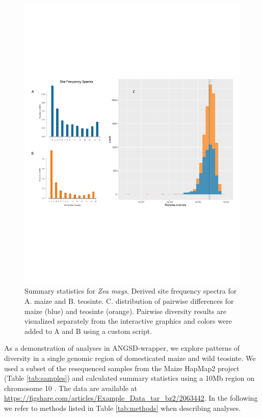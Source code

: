 \documentclass[10pt,a4paper]{article}
\begin{document}
\begin{figure}
\centering
\includegraphics[width=0.8\linewidth]{figures/figure3big.pdf}
\caption{Summary statistics for {\it Zea mays}. Derived site frequency spectra for A. maize and B. teosinte. C. distribution of pairwise differences for maize (blue) and teosinte (orange). Pairwise diversity results are visualized separately from the interactive graphics and colors were added to A and B using a custom script.}
\label{fig:figure3}
\end{figure}
As a demonstration of analyses in ANGSD-wrapper, we explore patterns of diversity in a single genomic region of domesticated maize and wild teosinte. 
We used a subset of the resequenced samples from the Maize HapMap2 project (Table \ref{tab:samples}) and calculated summary statistics using a 10Mb region on chromosome 10 \citep{chia2012maize}. 
The data are available at \url{https://figshare.com/articles/Example_Data_tar_bz2/2063442}. 
In the following we refer to methods listed in Table \ref{tab:methods} when describing analyses.
\end{document}
